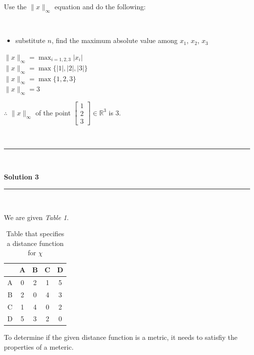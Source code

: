 \documentclass{article}
\begin{document}
\parbox{\textwidth}{Use the $\|x\|_{\infty}$ equation and do the following:}\\

\begin{itemize}
    \item {substitute $n$, find the maximum absolute value among $x_1$, $x_2$, $x_3$}
\end{itemize}

$\|x\|_{\infty} = \max_{i=1,2,3} |x_i|$\\

$\|x\|_{\infty} = \max\{|1|, |2|, |3|\}$\\

$\|x\|_{\infty} = \max\{1, 2, 3\}$\\

$\|x\|_{\infty} = 3$\\

\parbox{\textwidth}{$\therefore$ $\|x\|_{\infty}$ of the point $\begin{bmatrix} 1 \\ 2 \\ 3 \end{bmatrix} \in \mathbb{R}^3$ is $3$.}\\

\noindent\rule{\textwidth}{0.4pt}\\

\newpage

\textbf{Solution 3}

\noindent\rule{\textwidth}{0.4pt}\\

\parbox{\textwidth}{We are given \textit{Table 1}.}

\begin{table}[h]
  \centering
  \begin{tabular}{c|cccc}
    & A & B & C & D \\ \hline
  A & 0 & 2 & 1 & 5 \\
  B & 2 & 0 & 4 & 3 \\
  C & 1 & 4 & 0 & 2 \\
  D & 5 & 3 & 2 & 0 \\
  \end{tabular}
  \caption{Table that specifies a distance function for $\chi$}
  \label{tab:example}
\end{table}

\parbox{\textwidth}{To determine if the given distance function is a metric, it needs to satisfiy the properties of a meteric.}\\
\end{document}
